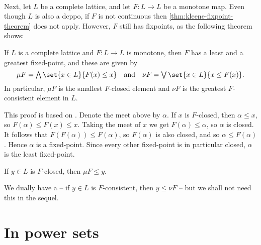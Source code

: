 \documentclass[a4paper, 11pt, article, danish, oneside]{memoir}
\DeclareMathOperator*{\smallbigvee}{\textstyle\bigvee}
\DeclareMathOperator*{\bigjoin}{\mathchoice
    {\smallbigvee}%
    {\bigvee}%
    {\bigvee}%
    {\bigvee}%
}
\DeclareMathOperator*{\smallbigwedge}{\textstyle\bigwedge}
\DeclareMathOperator*{\bigmeet}{\mathchoice
    {\smallbigwedge}%
    {\bigwedge}%
    {\bigwedge}%
    {\bigwedge}%
}
\newcommand{\newpar}{\paragraph{}}
\begin{document}
\newpar

Next, let $L$ be a complete lattice, and let $F \colon L \to L$ be a monotone map. Even though $L$ is also a dcppo, if $F$ is not continuous then \cref{thm:kleene-fixpoint-theorem} does not apply. However, $F$ still has fixpoints, as the following theorem shows:

\begin{theorem}
    \label{thm:knaster-tarski}
    If $L$ is a complete lattice and $F \colon L \to L$ is monotone, then $F$ has a least and a greatest fixed-point, and these are given by
    \begin{equation*}
        \mu F
            = \bigmeet \set{x \in L}{F(x) \leq x}
        \quad \text{and} \quad
        \nu F
            = \bigjoin \set{x \in L}{x \leq F(x)}.
    \end{equation*}
    In particular, $\mu F$ is the smallest $F$-closed element and $\nu F$ is the greatest $F$-consistent element in $L$.
\end{theorem}

\begin{prooffootnote}{This proof is based on \textcite[Theorem~2.35]{davey-priestley-order}.}
    Denote the meet above by $\alpha$. If $x$ is $F$-closed, then $\alpha \leq x$, so $F(\alpha) \leq F(x) \leq x$. Taking the meet of $x$ we get $F(\alpha) \leq \alpha$, so $\alpha$ is closed. It follows that $F(F(\alpha)) \leq F(\alpha)$, so $F(\alpha)$ is also closed, and so $\alpha \leq F(\alpha)$. Hence $\alpha$ is a fixed-point. Since every other fixed-point is in particular closed, $\alpha$ is the least fixed-point.
\end{prooffootnote}

\begin{corollarynoproof}
    \label{cor:induction-abstract}
    If $y \in L$ is $F$-closed, then $\mu F \leq y$.
\end{corollarynoproof}
%
We dually have a  -- if $y \in L$ is $F$-consistent, then $y \leq \nu F$ -- but we shall not need this in the sequel.


\section{In power sets}


\newcommand{\myinfrule}[3]{%
    \ifstrempty{#1}%
        {%
            #2 \vdash #3
        }{%
            #1 \colon #2 \vdash #3
        }%
}
\end{document}
